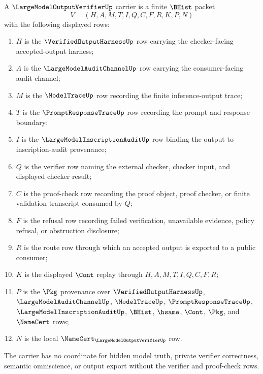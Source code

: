 \begin{definition}
\label{def:large-model-output-verifier-carrier}
A $\LargeModelOutputVerifierUp$ carrier is a finite $\BHist$ packet
$$
V=(H,A,M,T,I,Q,C,F,R,K,P,N)
$$
with the following displayed rows:
\begin{enumerate}
\item $H$ is the $\VerifiedOutputHarnessUp$ row carrying the checker-facing accepted-output harness;
\item $A$ is the $\LargeModelAuditChannelUp$ row carrying the consumer-facing audit channel;
\item $M$ is the $\ModelTraceUp$ row recording the finite inference-output trace;
\item $T$ is the $\PromptResponseTraceUp$ row recording the prompt and response boundary;
\item $I$ is the $\LargeModelInscriptionAuditUp$ row binding the output to inscription-audit provenance;
\item $Q$ is the verifier row naming the external checker, checker input, and displayed checker result;
\item $C$ is the proof-check row recording the proof object, proof checker, or finite validation transcript consumed by $Q$;
\item $F$ is the refusal row recording failed verification, unavailable evidence, policy refusal, or obstruction disclosure;
\item $R$ is the route row through which an accepted output is exported to a public consumer;
\item $K$ is the displayed $\Cont$ replay through $H,A,M,T,I,Q,C,F,R$;
\item $P$ is the $\Pkg$ provenance over $\VerifiedOutputHarnessUp$, $\LargeModelAuditChannelUp$, $\ModelTraceUp$, $\PromptResponseTraceUp$, $\LargeModelInscriptionAuditUp$, $\BHist$, $\hsame$, $\Cont$, $\Pkg$, and $\NameCert$ rows;
\item $N$ is the local $\NameCert_{\LargeModelOutputVerifierUp}$ row.
\end{enumerate}
The carrier has no coordinate for hidden model truth, private verifier correctness, semantic omniscience, or output export without the verifier and proof-check rows.
\end{definition}

